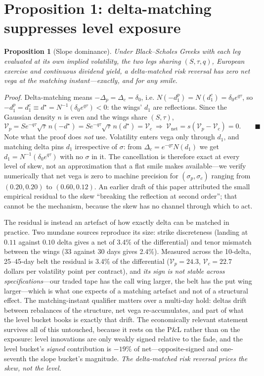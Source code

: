 \documentclass[11pt]{article}
\newtheorem{prop}{Proposition}
\begin{document}
\section{Proposition 1: delta-matching suppresses level exposure}
\begin{prop}[Slope dominance]
Under Black--Scholes Greeks with each leg evaluated at its own implied volatility, the two
legs sharing $(S, \tau, q)$, European exercise and continuous dividend yield, a delta-matched
risk reversal has zero net vega at the matching instant---exactly, and for any smile.
\end{prop}
\emph{Proof.} Delta-matching means $-\Delta_p = \Delta_c = \delta_0$, i.e.
$N(-d_1^p) = N(d_1^c) = \delta_0 e^{q\tau}$, so $-d_1^p = d_1^c \equiv d^\star =
N^{-1}(\delta_0 e^{q\tau}) < 0$: the wings' $d_1$ are reflections. Since the Gaussian density
$n$ is even and the wings share $(S, \tau)$,
\[ \mathcal V_p = S e^{-q\tau}\sqrt{\tau}\, n(-d^\star) = S e^{-q\tau}\sqrt{\tau}\, n(d^\star)
 = \mathcal V_c \ \Rightarrow\ \mathcal V_{\mathrm{net}} = s(\mathcal V_p - \mathcal V_c) = 0.
 \qquad\blacksquare \]
Note what the proof does \emph{not} use. Volatility enters vega only through $d_1$, and
matching delta pins $d_1$ irrespective of $\sigma$: from $\Delta_c = e^{-q\tau}N(d_1)$ we get
$d_1 = N^{-1}(\delta_0 e^{q\tau})$ with no $\sigma$ in it. The cancellation is therefore exact
at every level of skew, not an approximation that a flat smile makes available---we verify
numerically that net vega is zero to machine precision for $(\sigma_p, \sigma_c)$ ranging from
$(0.20, 0.20)$ to $(0.60, 0.12)$. An earlier draft of this paper attributed the small empirical
residual to the skew ``breaking the reflection at second order''; that cannot be the mechanism,
because the skew has no channel through which to act.

The residual is instead an artefact of how exactly delta can be matched in practice. Two mundane
sources reproduce its size: strike discreteness (landing at $0.11$ against $0.10$ delta gives a
net of 3.4\% of the differential) and tenor mismatch between the wings (33 against 30 days gives
2.4\%). Measured across the 10-delta, 25--45-day belt the residual is 3.4\% of the differential
($\mathcal V_p = 24.3$, $\mathcal V_c = 22.7$ dollars per volatility point per contract), and
\emph{its sign is not stable across specifications}---our traded tape has the call wing larger,
the belt has the put wing larger---which is what one expects of a matching artefact and not of a
structural effect. The matching-instant qualifier matters over a multi-day hold: deltas drift
between rebalances of the structure, net vega re-accumulates, and part of what the level
bucket books is exactly that drift. The economically relevant statement survives all of this untouched, because it
rests on the P\&L rather than on the exposure: level innovations are only weakly signed relative
to the fade, and the level bucket's \emph{signed} contribution is $-19\%$ of net---opposite-signed
and one-seventh the slope bucket's magnitude. \emph{The delta-matched risk reversal prices the skew, not the
level.}
\end{document}
